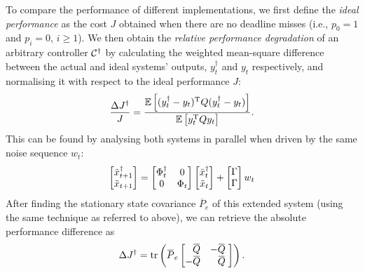 To compare the performance of different implementations, we first define the \emph{ideal performance} as the cost $J$ obtained when there are no deadline misses (i.e., $p_0 = 1$ and $p_i = 0$, $i \geq 1$).
We then obtain the \emph{relative performance degradation} of an arbitrary controller $\mathcal{C}^{\dagger}$ by calculating the weighted mean-square difference between the actual and ideal systems' outputs, $y^{\dagger}_t$ and $y_t$ respectively, and normalising it with respect to the ideal performance $J$:
\begin{equation}
    \label{eq:relcost}
    \frac{\Delta J^{\dagger}}{J} = \frac{\E{ (y^{\dagger}_t - y_t)^{\T} Q (y^{\dagger}_t - y_t) }}{ \E{ y_t^{\T} Q y_t }}.
\end{equation}
This can be found by analysing both systems in parallel when driven by the same noise sequence $w_t$:
\begin{equation*}
    \begin{bmatrix}
        \tilde{x}_{t+1}^\dagger \\ \tilde{x}_{t+1}%
    \end{bmatrix} =
    \begin{bmatrix}
        \clmat{}_t^\dagger & 0 \\ 0 & \clmat{}_t%
    \end{bmatrix}
    \begin{bmatrix}
        \tilde{x}_t^\dagger \\ \tilde{x}_t%
    \end{bmatrix} +
    \begin{bmatrix}
        \clinp{} \\ \clinp{}
    \end{bmatrix} w_t
\end{equation*}
After finding the stationary state covariance $\overbar{P}_e$ of this extended system (using the same technique as referred to above), we can retrieve the absolute performance difference as
\begin{equation*}
    \label{eq:deltaJ}
    \Delta J^{\dagger} = \trace{ \overbar{P}_e  \begin{bmatrix}
        \phantom{-}\overbar{Q} & -\overbar{Q}\phantom{,} \\
        -\overbar{Q} & \phantom{-}\overbar{Q}\phantom{,}
    \end{bmatrix} }.
\end{equation*}

